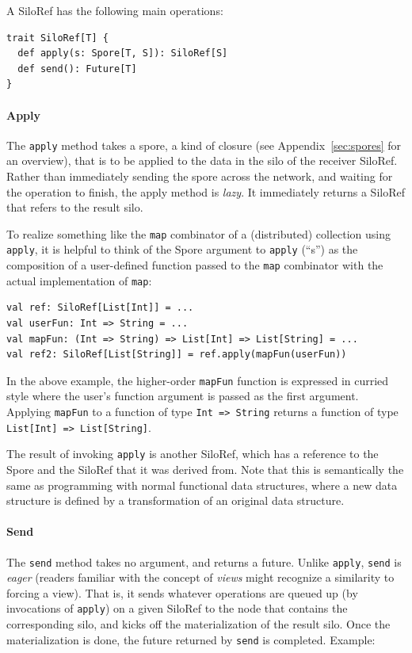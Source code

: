 \documentclass{easychair}
\begin{document}
A SiloRef has the following main operations:
\begin{verbatim}
trait SiloRef[T] {
  def apply(s: Spore[T, S]): SiloRef[S]
  def send(): Future[T]
}
\end{verbatim}

\paragraph{Apply}

The \verb|apply| method takes a spore, a kind of closure (see Appendix~\ref{sec:spores} for an overview),
that is to be applied to the data in the silo of the receiver SiloRef. Rather than immediately sending
the spore across the network, and waiting for the operation to finish, the
apply method is \emph{lazy}. It immediately returns a SiloRef that refers to the
result silo.

To realize something like the \verb|map| combinator of a (distributed) collection using \verb|apply|,
it is helpful to think of the Spore argument to \verb|apply| (``s'') as the composition of a
user-defined function passed to the \verb|map| combinator with the actual implementation of \verb|map|:

\begin{verbatim}
val ref: SiloRef[List[Int]] = ...
val userFun: Int => String = ...
val mapFun: (Int => String) => List[Int] => List[String] = ...
val ref2: SiloRef[List[String]] = ref.apply(mapFun(userFun))
\end{verbatim}

In the above example, the higher-order \verb|mapFun| function is expressed in curried
style where the user's function argument is passed as the first argument.
Applying \verb|mapFun| to a function of type \verb|Int => String| returns a function of type
\verb|List[Int] => List[String]|.

The result of invoking \verb|apply| is another SiloRef, which has a reference to the
Spore and the SiloRef that it was derived from. Note that this is semantically
the same as programming with normal functional data structures, where a new
data structure is defined by a transformation of an original data structure.

\paragraph{Send}

The \verb|send| method takes no argument, and returns a future. Unlike
\verb|apply|, \verb|send| is \emph{eager} (readers familiar with the concept
of \emph{views} might recognize a similarity to forcing a view). That is, it
sends whatever operations are queued up (by invocations of \verb|apply|) on a
given SiloRef to the node that contains the corresponding silo, and kicks off
the materialization of the result silo. Once the materialization is done, the
future returned by \verb|send| is completed. Example:
\end{document}
